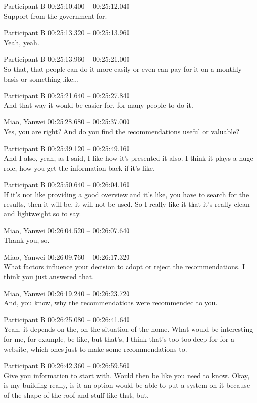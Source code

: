 {Participant B 00:25:10.400 -- 00:25:12.040 \\
Support from the government for.

Participant B 00:25:13.320 -- 00:25:13.960 \\
Yeah, yeah.

Participant B 00:25:13.960 -- 00:25:21.000 \\
So that, that people can do it more easily or even can pay for it on a monthly basis or something like...

Participant B 00:25:21.640 -- 00:25:27.840 \\
And that way it would be easier for, for many people to do it.

Miao, Yanwei 00:25:28.680 -- 00:25:37.000 \\
Yes, you are right? And do you find the recommendations useful or valuable?

Participant B 00:25:39.120 -- 00:25:49.160 \\
And I also, yeah, as I said, I like how it's presented it also. I think it plays a huge role, how you get the information back if it's like.

Participant B 00:25:50.640 -- 00:26:04.160 \\
If it's not like providing a good overview and it's like, you have to search for the results, then it will be, it will not be used. So I really like it that it's really clean and lightweight so to say.

Miao, Yanwei 00:26:04.520 -- 00:26:07.640 \\
Thank you, so.

Miao, Yanwei 00:26:09.760 -- 00:26:17.320 \\
What factors influence your decision to adopt or reject the recommendations. I think you just answered that.

Miao, Yanwei 00:26:19.240 -- 00:26:23.720 \\
And, you know, why the recommendations were recommended to you.

Participant B 00:26:25.080 -- 00:26:41.640 \\
Yeah, it depends on the, on the situation of the home. What would be interesting for me, for example, be like, but that's, I think that's too too deep for for a website, which ones just to make some recommendations to.

Participant B 00:26:42.360 -- 00:26:59.560 \\
Give you information to start with. Would then be like you need to know. Okay, is my building really, is it an option would be able to put a system on it because of the shape of the roof and stuff like that, but.

}
